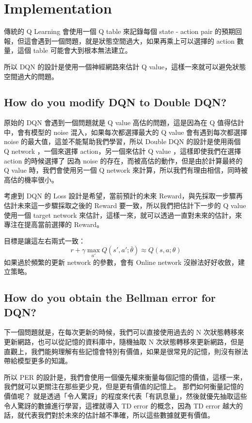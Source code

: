 \section{Implementation}
傳統的 Q Learning 會使用一個 Q table 來記錄每個 state - action pair 的預期回報，但這會遇到一個問題，就是狀態空間過大，如果再乘上可以選擇的 action 數量，這個 table 可能會大到根本無法建立。

所以 DQN 的設計是使用一個神經網路來估計 Q value，這樣一來就可以避免狀態空間過大的問題。

\subsection{How do you modify DQN to Double DQN?}
原始的 DQN 會遇到一個問題就是 Q value 高估的問題，這是因為在 Q 值得估計中，會有模型的 noise 混入，如果每次都選擇最大的 Q value 會有遇到每次都選擇 noise 的最大值，這並不能幫助我們學習，所以 Double DQN 的設計是使用兩個 Q network ，一個來選擇 action，另一個來估計 Q value ，這樣即使我們在選擇 action 的時候選擇了 因為 noise 的存在，而被高估的動作，但是由於計算最終的 Q value 時，我們會使用另一個 Q network 來計算，所以我們有理由相信，同時被高估的機率很小。

考慮到 DQN 的 Loss 設計是希望，當前預計的未來 Reward，與先採取一步驟再估計未來這一步驟採取之後的 Reward 要一致，所以我們把估計下一步的 Q value 使用一個 target network 來估計，這樣一來，就可以透過一直對未來的估計，來專注在提高當前選擇的 Reward。

目標是讓這左右兩式一致：
$$
r + \gamma \max_{a'} Q(s', a'; \bar{\theta}) \approx Q(s, a; \theta)
$$
如果過於頻繁的更新 network 的參數，會有 Online network 沒辦法好好收斂，建立策略。

\subsection{How do you obtain the Bellman error for DQN?}
下一個問題就是，在每次更新的時候，我們可以直接使用過去的 N 次狀態轉移來更新網路，也可以從記憶的資料庫中，隨機抽取 N 次狀態轉移來更新網路，但是直觀上，我們能夠理解有些記憶會特別有價值，如果是很常見的記憶，則沒有辦法帶給模型更多的知識。

所以 PER 的設計是，我們會使用一個優先權來衡量每個記憶的價值，這樣一來，我們就可以更關注在那些更少見，但是更有價值的記憶上。 那們如何衡量記憶的價值呢？ 就是透過「令人驚訝」的程度來代表「有訊息量」，然後就優先抽取這些令人驚訝的數據進行學習，這裡就導入 TD error 的概念，因為 TD error 越大的話，就代表我們對於未來的估計越不準確，所以這些數據就更有價值。

